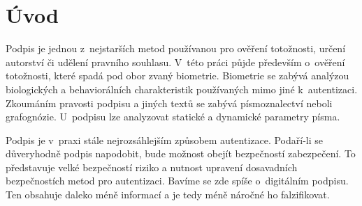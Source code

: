
%

\chapter{Úvod}
Podpis je jednou z~nejstarších metod používanou pro ověření totožnosti, určení autorství či udělení pravního souhlasu.
V~této práci půjde především o~ověření totožnosti, které spadá pod obor zvaný biometrie.
Biometrie se zabývá analýzou biologických a behaviorálních charakteristik používaných mimo jiné k~autentizaci. 
Zkoumáním pravosti podpisu a jiných textů se zabývá písmoznalectví neboli grafognózie.
U~podpisu lze analyzovat statické a dynamické parametry písma. 

Podpis je v~praxi stále nejrozsáhlejším způsobem autentizace. 
Podaří-li se důveryhodně podpis napodobit, bude možnost obejít bezpečností zabezpečení. 
To představuje velké bezpečností riziko a nutnost upravení dosavadních bezpečnostích metod pro autentizaci. 
Bavíme se zde spíše o~digitálním podpisu. Ten obsahuje daleko méně informací a je tedy méně náročné ho falzifikovat.


